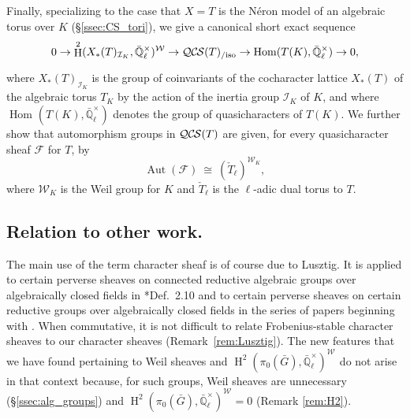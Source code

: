 \documentclass[10pt]{amsart}
\theoremstyle{plain}
\theoremstyle{definition}
\newcommand{\EE}{\mathbb{\bar Q}_\ell}
\newcommand{\EEx}{\EE^\times}
\newcommand{\Weil}[1]{\mathcal{W}_{#1}}
\DeclareMathOperator{\Aut}{Aut}
\DeclareMathOperator{\Hom}{Hom}
\DeclareMathOperator{\Hh}{H}
\newcommand{\iso}{{\ \cong\ }}
\newcommand{\cs}[1]{{\mathcal{#1}}}
\newcommand{\QCS}{{\mathcal{QC\hskip-0.8pt S}}}
\newcommand{\QCSiso}[1]{\QCS(#1)_{/\text{iso}}}
\newcommand{\bG}{\bar{G}}
\begin{document}
Finally, specializing to the case that $X = T$ is the N\'eron model of an algebraic torus over $K$ (\S\ref{ssec:CS_tori}), 
we give a canonical short exact sequence 
\[
0 \to \Hh^2(X_*(T)_{\mathcal{I}_K},\EEx)^{\Weil{}} \to \QCSiso{T} \to \Hom_\text{}(T(K),\EEx) \to 0,
\]
where $X_*(T)_{\mathcal{I}_K}$ is the group of coinvariants of the cocharacter lattice $X_*(T)$ of the algebraic torus
$T_K$ by the action of the inertia group $\mathcal{I}_K$ of $K$, and where $\Hom_\text{}(T(K),\EEx)$
denotes the group of quasicharacters of $T(K)$.
We further show that automorphism groups in $\QCS(T)$ are given, for every quasicharacter sheaf $\cs{F}$ for $T$, by
\[
\Aut(\cs{F}) \iso (\check{T}_\ell)^{\Weil{K}},
\]
where $\Weil{K}$ is the Weil group for $K$ and $\check{T}_\ell$ is the $\ell$-adic dual torus to $T$.

\iffalse
By any measure, there are more quasicharacter sheaves for $T$ than quasicharacters of $T(K)$.  
In this regard, we are reminded of the work of David Vogan \cite{vogan:93a}, in which he finds a geometrization
of complete Langlands parameters for $p$-adic groups 
and, in the process, is led to study the representations of all the pure rational forms of the $p$-adic group, simultaneously.
A similar phenomenon appears in recent work by Joseph Bernstein in which his geometric Ansatz leads
to the study of certain sheaves on the stacky classifying space of the $p$-adic group, resulting in a category
which appears to be tied to the representations of all the pure rational forms of the $p$-adic group \cite{bernstein:vogan_conference}.
Indeed, Bernstein has suggested to us that our category of quasicharacters for $T$ may be tied to
quasicharacters of all the pure rational forms of $T$; we do not pursue that suggestion in this paper.
\fi

\subsection*{Relation to other work.}
The main use of the term character sheaf is of course due to Lusztig.
It is applied to certain perverse sheaves on connected reductive algebraic groups over algebraically closed fields in
\cite{lusztig:85a}*{Def.~2.10} and to certain perverse sheaves on certain reductive groups over algebraically closed fields in the series of papers
beginning with \cite{lusztig:disconnected1}.
When commutative, it is not difficult to relate Frobenius-stable character sheaves to our character sheaves
(Remark~\ref{rem:Lusztig}). The new features that we have found pertaining to Weil sheaves
and $\Hh^2(\pi_0(\bG),\EEx)^{\Weil{}}$ do not arise in that context because, for such groups,
Weil sheaves are unnecessary (\S \ref{ssec:alg_groups}) and $\Hh^2(\pi_0(\bG),\EEx)^{\Weil{}}=0$ (Remark \ref{rem:H2}).
\end{document}
